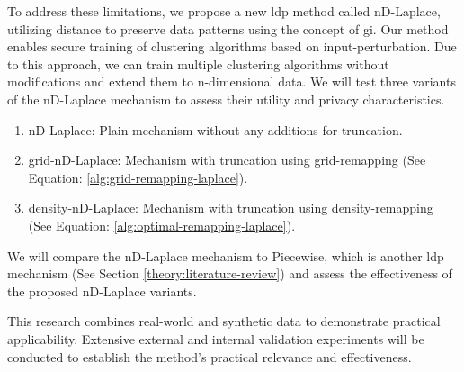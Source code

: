 To address these limitations, we propose a new \gls{ldp} method called nD-Laplace, utilizing distance to preserve data patterns using the concept of \gls{gi}. \newline
Our method enables secure training of clustering algorithms based on input-perturbation.
Due to this approach, we can train multiple clustering algorithms without modifications and extend them to n-dimensional data.
We will test three variants of the nD-Laplace mechanism to assess their utility and privacy characteristics.
\begin{enumerate}
  \item nD-Laplace: Plain mechanism without any additions for truncation.
  \item grid-nD-Laplace: Mechanism with truncation using grid-remapping (See Equation: \ref{alg:grid-remapping-laplace}).
  \item density-nD-Laplace: Mechanism with truncation using density-remapping (See Equation: \ref{alg:optimal-remapping-laplace}).
\end{enumerate}
We will compare the nD-Laplace mechanism to Piecewise, which is another \gls{ldp} mechanism (See Section \ref{theory:literature-review}) and assess the effectiveness of the proposed nD-Laplace variants.

This research combines real-world and synthetic data to demonstrate practical applicability.
Extensive external and internal validation experiments will be conducted to establish the method's practical relevance and effectiveness.


